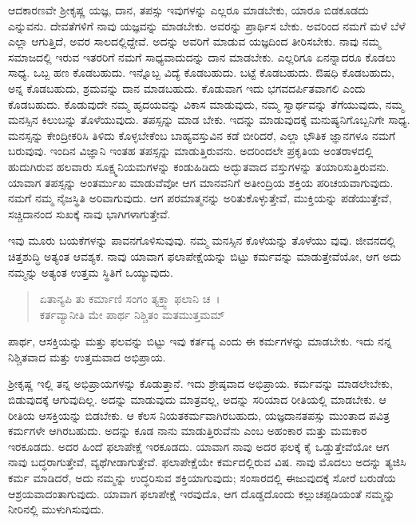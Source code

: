 ಆದಕಾರಣವೇ ಶ‍್ರೀಕೃಷ್ಣ ಯಜ್ಞ, ದಾನ, ತಪಸ್ಸು ಇವುಗಳನ್ನು ಎಲ್ಲರೂ ಮಾಡಬೇಕು, ಯಾರೂ ಬಿಡಕೂಡದು ಎನ್ನುವನು. ದೇವತೆಗಳಿಗೆ ನಾವು ಯಜ್ಞವನ್ನು ಮಾಡಬೇಕು. ಅವರನ್ನು ಪ್ರಾರ್ಥಿಸ ಬೇಕು. ಅವರಿಂದ ನಮಗೆ ಮಳೆ ಬೆಳೆ ಎಲ್ಲಾ ಆಗುತ್ತಿದೆ, ಅವರ ಸಾಲದಲ್ಲಿದ್ದೇವೆ. ಅದನ್ನು ಅವರಿಗೆ ಮಾಡುವ ಯಜ್ಞದಿಂದ ತೀರಿಸಬೇಕು. ನಾವು ನಮ್ಮ ಸಮಾಜದಲ್ಲಿ ಇರುವ ಇತರರಿಗೆ ನಮಗೆ ಸಾಧ್ಯವಾದುದನ್ನು ದಾನ ಮಾಡಬೇಕು. ಎಲ್ಲರಿಗೂ ಏನನ್ನಾದರೂ ಕೊಡಲು ಸಾಧ್ಯ. ಒಬ್ಬ ಹಣ ಕೊಡಬಹುದು. ಇನ್ನೊಬ್ಬ ವಿದ್ಯೆ ಕೊಡಬಹುದು. ಬಟ್ಟೆ ಕೊಡಬಹುದು. ಔಷಧಿ ಕೊಡಬಹುದು, ಅನ್ನ ಕೊಡಬಹುದು, ಶ್ರಮವನ್ನು ದಾನ ಮಾಡಬಹುದು. ಕೊಡುವಾಗ ಇದು ಭಗವದರ್ಪಿತವಾಗಲಿ ಎಂದು ಕೊಡಬಹುದು. ಕೊಡುವುದೇ ನಮ್ಮ ಹೃದಯವನ್ನು ವಿಕಾಸ ಮಾಡುವುದು, ನಮ್ಮ ಸ್ವಾರ್ಥವನ್ನು ತೆಗೆಯುವುದು, ನಮ್ಮ ಮನಸ್ಸಿನ ಕಿಲುಬನ್ನು ತೊಳೆಯುವುದು. ತಪಸ್ಸನ್ನು ಮಾಡ ಬೇಕು. ಇದನ್ನು ಮಾಡುವುದಕ್ಕೆ ಮನುಷ್ಯನಿಗೊಬ್ಬನಿಗೇ ಸಾಧ್ಯ. ಮನಸ್ಸನ್ನು ಕೇಂದ್ರೀಕರಿಸಿ ತಿಳಿದು ಕೊಳ್ಳಬೇಕೆಂಬ ಬಾಹ್ಯವಸ್ತುವಿನ ಕಡೆ ಬೀರಿದರೆ, ಎಲ್ಲಾ ಭೌತಿಕ ಜ್ಞಾನಗಳೂ ನಮಗೆ ಬರುವುವು. ಇಂದಿನ ವಿಜ್ಞಾನಿ ಇಂತಹ ತಪಸ್ಸನ್ನು ಮಾಡುತ್ತಿರುವನು. ಅದರಿಂದಲೇ ಪ್ರಕೃತಿಯ ಅಂತರಾಳದಲ್ಲಿ ಹುದುಗಿರುವ ಹಲವಾರು ಸೂಕ್ಷ್ಮನಿಯಮಗಳನ್ನು ಕಂಡುಹಿಡಿದು ಅದ್ಭುತವಾದ ವಸ್ತುಗಳನ್ನು ತಯಾರಿಸುತ್ತಿರುವನು. ಯಾವಾಗ ತಪಸ್ಸನ್ನು ಅಂತರ್ಮುಖ ಮಾಡುವೆವೋ ಆಗ ಮಾನವನಿಗೆ ಅತೀಂದ್ರಿಯ ಶಕ್ತಿಯ ಪರಿಚಯವಾಗುವುದು. ನಮಗೆ ನಮ್ಮ ನೈಜಸ್ಥಿತಿ ಅರಿವಾಗುವುದು. ಆಗ ಪರಮಾತ್ಮನನ್ನು ಅರಿತುಕೊಳ್ಳುತ್ತೇವೆ, ಮುಕ್ತಿಯನ್ನು ಪಡೆಯುತ್ತೇವೆ, ಸಚ್ಚಿದಾನಂದ ಸುಖಕ್ಕೆ ನಾವು ಭಾಗಿಗಳಾಗುತ್ತೇವೆ.

ಇವು ಮೂರು ಬಯಕೆಗಳನ್ನು ಪಾವನಗೊಳಿಸುವುವು. ನಮ್ಮ ಮನಸ್ಸಿನ ಕೊಳೆಯನ್ನು ತೊಳೆಯು ವುವು. ಜೀವನದಲ್ಲಿ ಚಿತ್ತಶುದ್ಧಿ ಅತ್ಯಂತ ಆವಶ್ಯಕ. ನಾವು ಯಾವಾಗ ಫಲಾಪೇಕ್ಷೆಯನ್ನು ಬಿಟ್ಟು ಕರ್ಮವನ್ನು ಮಾಡುತ್ತೇವೆಯೋ, ಆಗ ಅದು ನಮ್ಮನ್ನು ಅತ್ಯಂತ ಉತ್ತಮ ಸ್ಥಿತಿಗೆ ಒಯ್ಯುವುದು.

\begin{verse}
ಏತಾನ್ಯಪಿ ತು ಕರ್ಮಾಣಿ ಸಂಗಂ ತ್ಯಕ್ತ್ವಾ ಫಲಾನಿ ಚ~।\\ಕರ್ತವ್ಯಾನೀತಿ ಮೇ ಪಾರ್ಥ ನಿಶ್ಚಿತಂ ಮತಮುತ್ತಮಮ್ 
\end{verse}

{\small ಪಾರ್ಥ, ಆಸಕ್ತಿಯನ್ನು ಮತ್ತು ಫಲವನ್ನು ಬಿಟ್ಟು ಇವು ಕರ್ತವ್ಯ ಎಂದು ಈ ಕರ್ಮಗಳನ್ನು ಮಾಡಬೇಕು. ಇದು ನನ್ನ ನಿಶ್ಚಿತವಾದ ಮತ್ತು ಉತ್ತಮವಾದ ಅಭಿಪ್ರಾಯ.}

ಶ‍್ರೀಕೃಷ್ಣ ಇಲ್ಲಿ ತನ್ನ ಅಭಿಪ್ರಾಯಗಳನ್ನು ಕೊಡುತ್ತಾನೆ. ಇದು ಶ್ರೇಷ್ಠವಾದ ಅಭಿಪ್ರಾಯ. ಕರ್ಮವನ್ನು ಮಾಡಲೇಬೇಕು, ಬಿಡುವುದಕ್ಕೆ ಆಗುವುದಿಲ್ಲ. ಅದನ್ನು ಮಾಡುವುದು ಮಾತ್ರವಲ್ಲ, ಅದನ್ನು ಸರಿಯಾದ ರೀತಿಯಲ್ಲಿ ಮಾಡಬೇಕು. ಆ ರೀತಿಯ ಆಸಕ್ತಿಯನ್ನು ಬಿಡಬೇಕು. ಆ ಕೆಲಸ ನಿಯತಕರ್ಮವಾಗಿರಬಹುದು, ಯಜ್ಞದಾನತಪಸ್ಸು ಮುಂತಾದ ಪವಿತ್ರ ಕರ್ಮಗಳೇ ಆಗಿರಬಹುದು. ಅದನ್ನು ಕೂಡ ನಾನು ಮಾಡುತ್ತಿರುವೆನು ಎಂಬ ಅಹಂಕಾರ ಮತ್ತು ಮಮಕಾರ ಇರಕೂಡದು. ಅದರ ಹಿಂದೆ ಫಲಾಪೇಕ್ಷೆ ಇರಕೂಡದು. ಯಾವಾಗ ನಾವು ಅದರ ಫಲಕ್ಕೆ ಕೈ ಒಡ್ಡುತ್ತೇವೆಯೋ ಆಗ ನಾವು ಬದ್ಧರಾಗುತ್ತೇವೆ, ವ್ಯಥೆಗೀಡಾಗುತ್ತೇವೆ. ಫಲಾಪೇಕ್ಷೆಯೇ ಕರ್ಮದಲ್ಲಿರುವ ವಿಷ. ನಾವು ಮೊದಲು ಅದನ್ನು ತ್ಯಜಿಸಿ ಕರ್ಮ ಮಾಡಿದರೆ, ಅದು ನಮ್ಮನ್ನು ಉದ್ಧರಿಸುವ ಶಕ್ತಿಯಾಗುವುದು; ಸಂಸಾರದಲ್ಲಿ ಈಜುವುದಕ್ಕೆ ಸೋರೆ ಬರುಡೆಯ ಆಶ್ರಯವಾದಂತಾಗುವುದು. ಯಾವಾಗ ಫಲಾಪೇಕ್ಷೆ ಇರವುದೊ, ಆಗ ದೊಡ್ಡದೊಂದು ಕಲ್ಲುಚಪ್ಪಡಿಯಂತೆ ನಮ್ಮನ್ನು ನೀರಿನಲ್ಲಿ ಮುಳುಗಿಸುವುದು.

